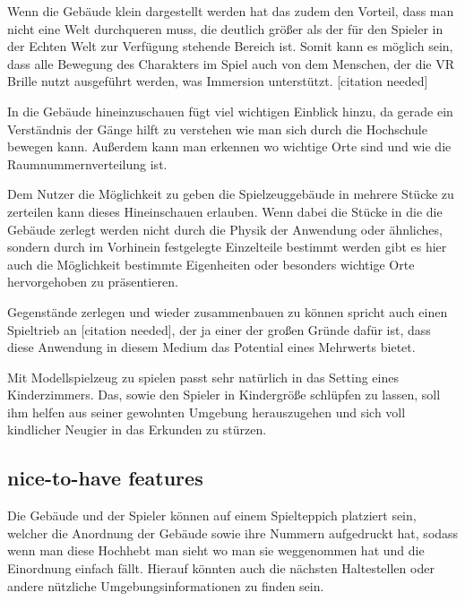 \documentclass[11pt]{article} %
\begin{document}
Wenn die Gebäude klein dargestellt werden hat das zudem den Vorteil, dass man nicht eine Welt durchqueren muss, die deutlich größer als der für den Spieler in der Echten Welt zur Verfügung stehende Bereich ist. Somit kann es möglich sein, dass alle Bewegung des Charakters im Spiel auch von dem Menschen, der die VR Brille nutzt ausgeführt werden, was Immersion unterstützt. [citation needed]



In die Gebäude hineinzuschauen fügt viel wichtigen Einblick hinzu, da gerade ein Verständnis der Gänge hilft zu verstehen wie man sich durch die Hochschule bewegen kann. Außerdem kann man erkennen wo wichtige Orte sind und wie die Raumnummernverteilung ist.

Dem Nutzer die Möglichkeit zu geben die Spielzeuggebäude in mehrere Stücke zu zerteilen kann dieses Hineinschauen erlauben. Wenn dabei die Stücke in die die Gebäude zerlegt werden nicht durch die Physik der Anwendung oder ähnliches, sondern durch im Vorhinein festgelegte Einzelteile bestimmt werden gibt es hier auch die Möglichkeit bestimmte Eigenheiten oder besonders wichtige Orte hervorgehoben zu präsentieren.

Gegenstände zerlegen und wieder zusammenbauen zu können spricht auch einen Spieltrieb an [citation needed], der ja einer der großen Gründe dafür ist, dass diese Anwendung in diesem Medium das Potential eines Mehrwerts bietet.

Mit Modellspielzeug zu spielen passt sehr natürlich in das Setting eines Kinderzimmers. Das, sowie den Spieler in Kindergröße schlüpfen zu lassen, soll ihm helfen aus seiner gewohnten Umgebung herauszugehen und sich voll kindlicher Neugier in das Erkunden zu stürzen.

\subsection{nice-to-have features}

Die Gebäude und der Spieler können auf einem Spielteppich platziert sein, welcher die Anordnung der Gebäude sowie ihre Nummern aufgedruckt hat, sodass wenn man diese Hochhebt man sieht wo man sie weggenommen hat und die Einordnung einfach fällt. Hierauf könnten auch die nächsten Haltestellen oder andere nützliche Umgebungsinformationen zu finden sein. 
\end{document}
